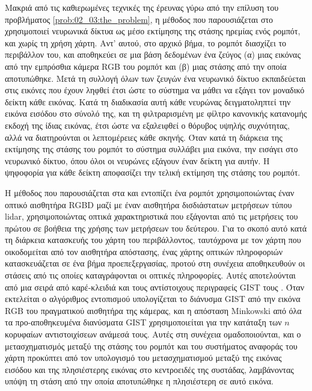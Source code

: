Μακριά από τις καθιερωμένες τεχνικές της έρευνας γύρω από την επίλυση του
προβλήματος \ref{prob:02_03:the_problem}, η μέθοδος που παρουσιάζεται στο
\cite{Lyrio2014} χρησιμοποιεί νευρωνικά δίκτυα ως μέσο εκτίμησης της στάσης
ηρεμίας ενός ρομπότ, και χωρίς τη χρήση χάρτη. Αντ' αυτού, στο αρχικό βήμα, το
ρομπότ διασχίζει το περιβάλλον του, και αποθηκεύει σε μια βάση δεδομένων ένα
ζεύγος (α) μιας εικόνας από την εμπρόσθια κάμερα RGB του ρομπότ και (β) μιας
στάσης από την οποία αποτυπώθηκε.  Μετά τη συλλογή όλων των ζευγών ένα
νευρωνικό δίκτυο εκπαιδεύεται στις εικόνες που έχουν ληφθεί έτσι ώστε το
σύστημα να μάθει να εξάγει τον μοναδικό δείκτη κάθε εικόνας. Κατά τη διαδικασία
αυτή κάθε νευρώνας δειγματοληπτεί την εικόνα εισόδου στο σύνολό της, και τη
φιλτραρισμένη με φίλτρο κανονικής κατανομής εκδοχή της ίδιας εικόνας, έτσι ώστε
να εξαλειφθεί ο θόρυβος υψηλής συχνότητας, αλλά να διατηρούνται οι λεπτομέρειες
κάθε σκηνής.  Όταν κατά τη διάρκεια της εκτίμησης της στάσης του ρομπότ το
σύστημα συλλάβει μια εικόνα, την εισάγει στο νευρωνικό δίκτυο, όπου όλοι οι
νευρώνες εξάγουν έναν δείκτη για αυτήν. Η ψηφοφορία για κάθε δείκτη αποφασίζει
την τελική εκτίμηση της στάσης του ρομπότ.

Η μέθοδος που παρουσιάζεται στα \cite{Su2017} και \cite{Chen2019b} εντοπίζει
ένα ρομπότ χρησιμοποιώντας έναν οπτικό αισθητήρα RGBD μαζί με έναν αισθητήρα
δισδιάστατων μετρήσεων τύπου lidar, χρησιμοποιώντας οπτικά χαρακτηριστικά που
εξάγονται από τις μετρήσεις του πρώτου σε βοήθεια της χρήσης των μετρήσεων του
δεύτερου. Για το σκοπό αυτό κατά τη διάρκεια κατασκευής του χάρτη του
περιβάλλοντος, ταυτόχρονα με τον χάρτη που οικοδομείται από τον αισθητήρα
απόστασης, ένας χάρτης οπτικών πληροφοριών κατασκευάζεται σε ένα βήμα
προεπεξεργασίας, προτού στη συνέχεια αποθηκευθούν οι στάσεις από τις οποίες
καταγράφονται οι οπτικές πληροφορίες. Αυτές αποτελούνται από μια σειρά από
καρέ-κλειδιά και τους αντίστοιχους περιγραφείς GIST τους
\cite{Singh2010,Azzi2015}. Όταν εκτελείται ο αλγόριθμος εντοπισμού
υπολογίζεται το διάνυσμα GIST από την εικόνα RGB του πραγματικού αισθητήρα της
κάμερας, και η απόσταση Minkowski από όλα τα προ-αποθηκευμένα διανύσματα GIST
χρησιμοποιείται για την κατάταξη των $n$ κορυφαίων αντιστοιχίσεων ανάμεσά τους.
Αυτές στη συνέχεια ομαδοποιούνται, και ο μετασχηματισμός μεταξύ της στάσης του
ρομπότ και του συστήματος αναφοράς του χάρτη προκύπτει από τον υπολογισμό του
μετασχηματισμού μεταξύ της εικόνας εισόδου και της πλησιέστερης εικόνας στο
κεντροειδές της συστάδας, λαμβάνοντας υπόψη τη στάση από την οποία αποτυπώθηκε
η πλησιέστερη σε αυτό εικόνα.

